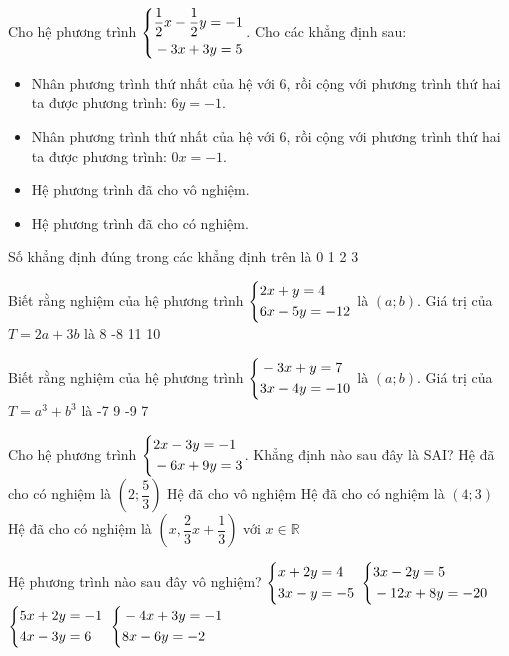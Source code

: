\begin{ex}
Cho hệ phương trình $\left\{\begin{aligned}&\dfrac{1}{2}x - \dfrac{1}{2}y = -1 \\ &-3x + 3y = 5\end{aligned}\right.$. Cho các khẳng định sau:
\begin{itemize}
    \item[(i)] Nhân phương trình thứ nhất của hệ với 6, rồi cộng với phương trình thứ hai ta được phương trình: $6y = -1$.
    \item[(ii)] Nhân phương trình thứ nhất của hệ với 6, rồi cộng với phương trình thứ hai ta được phương trình: $0x = -1$.
    \item[(iii)] Hệ phương trình đã cho vô nghiệm.
    \item[(iv)] Hệ phương trình đã cho có nghiệm.
\end{itemize}
Số khẳng định đúng trong các khẳng định trên là
\choice
{0}
{1}
{2}
{3}
\end{ex}

\begin{ex}
Biết rằng nghiệm của hệ phương trình $\left\{\begin{aligned}&2x + y = 4 \\ &6x - 5y = -12\end{aligned}\right.$ là $(a; b)$. Giá trị của $T = 2a + 3b$ là
\choice
{8}
{-8}
{11}
{10}
\end{ex}

\begin{ex}
Biết rằng nghiệm của hệ phương trình $\left\{\begin{aligned}&-3x + y = 7 \\ &3x - 4y = -10\end{aligned}\right.$ là $(a; b)$. Giá trị của $T = a^3 + b^3$ là
\choice
{-7}
{9}
{-9}
{7}
\end{ex}

\begin{ex}
Cho hệ phương trình $\left\{\begin{aligned}&2x - 3y = -1 \\ &-6x + 9y = 3\end{aligned}\right.$. Khẳng định nào sau đây là SAI?
\choice
{Hệ đã cho có nghiệm là $\left(2; \dfrac{5}{3}\right)$}
{Hệ đã cho vô nghiệm}
{Hệ đã cho có nghiệm là $(4; 3)$}
{Hệ đã cho có nghiệm là $\left(x, \dfrac{2}{3}x + \dfrac{1}{3}\right)$ với $x \in \mathbb{R}$}
\end{ex}

\begin{ex}
Hệ phương trình nào sau đây vô nghiệm?
\choice
{$\left\{\begin{aligned}&x + 2y = 4 \\ &3x - y = -5\end{aligned}\right.$}
{$\left\{\begin{aligned}&3x - 2y = 5 \\ &-12x + 8y = -20\end{aligned}\right.$}
{$\left\{\begin{aligned}&5x + 2y = -1 \\ &4x - 3y = 6\end{aligned}\right.$}
{$\left\{\begin{aligned}&-4x + 3y = -1 \\ &8x - 6y = -2\end{aligned}\right.$}
\end{ex}

